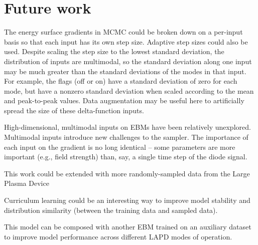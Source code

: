 
\section{Future work}
The energy surface gradients in MCMC could be broken down on a per-input basis so that each input has its own step size. Adaptive step sizes could also be used. 
Despite scaling the step size to the lowest standard deviation, the distribution of inputs are multimodal, so the standard deviation along one input may be much greater than the standard deviations of the modes in that input. For example, the flags (off or on) have a standard deviation of zero for each mode, but have a nonzero standard deviation when scaled according to the mean and peak-to-peak values. Data augmentation may be useful here to artificially spread the size of these delta-function inputs.

High-dimensional, multimodal inputs on EBMs have been relatively unexplored. Multimodal inputs introduce new challenges to the sampler. The importance of each input on the gradient is no long identical -- some parameters are more important (e.g., field strength) than, say, a single time step of the diode signal. 

This work could be extended with more randomly-sampled data from the Large Plasma Device

Curriculum learning could be an interesting way to improve model stability and distribution similarity (between the training data and sampled data).

This model can be composed with another EBM trained on an auxiliary dataset to improve model performance across different LAPD modes of operation.